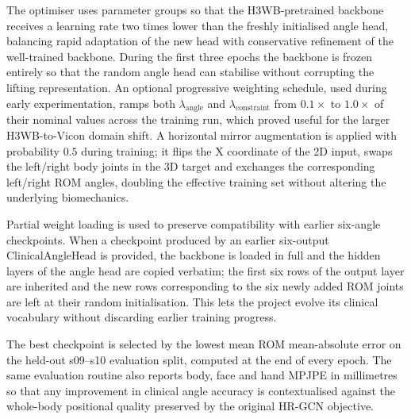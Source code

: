 The optimiser uses parameter groups so that the H3WB-pretrained
backbone receives a learning rate two times lower than the freshly
initialised angle head, balancing rapid adaptation of the new head
with conservative refinement of the well-trained backbone. During
the first three epochs the backbone is frozen entirely so that the
random angle head can stabilise without corrupting the lifting
representation. An optional progressive weighting schedule, used
during early experimentation, ramps both $\lambda_{\mathrm{angle}}$
and $\lambda_{\mathrm{constraint}}$ from $0.1\times$ to $1.0\times$
of their nominal values across the training run, which proved useful
for the larger H3WB-to-Vicon domain shift. A horizontal mirror
augmentation is applied with probability $0.5$ during training; it
flips the X coordinate of the 2D input, swaps the left/right body
joints in the 3D target and exchanges the corresponding left/right
ROM angles, doubling the effective training set without altering the
underlying biomechanics.

Partial weight loading is used to preserve compatibility with earlier
six-angle checkpoints. When a checkpoint produced by an earlier
six-output ClinicalAngleHead is provided, the backbone is loaded in
full and the hidden layers of the angle head are copied verbatim;
the first six rows of the output layer are inherited and the new
rows corresponding to the six newly added ROM joints are left at
their random initialisation. This lets the project evolve its
clinical vocabulary without discarding earlier training progress.

The best checkpoint is selected by the lowest mean ROM mean-absolute
error on the held-out s09--s10 evaluation split, computed at the end
of every epoch. The same evaluation routine also reports body, face
and hand MPJPE in millimetres so that any improvement in clinical
angle accuracy is contextualised against the whole-body positional
quality preserved by the original HR-GCN objective.
